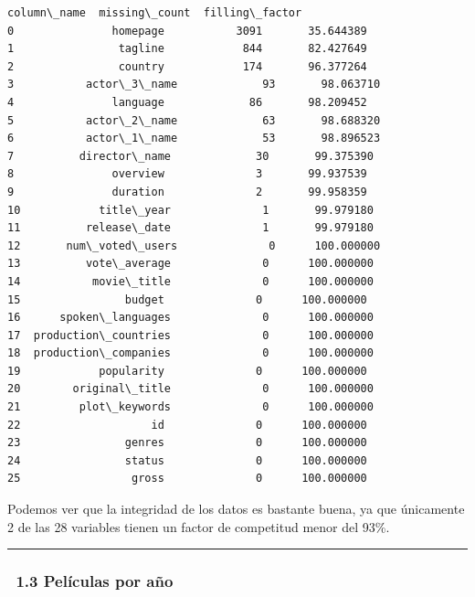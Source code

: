             \begin{tcolorbox}[breakable, boxrule=.5pt, size=fbox, pad at break*=1mm, opacityfill=0]
\begin{Verbatim}[commandchars=\\\{\}]
             column\_name  missing\_count  filling\_factor
0               homepage           3091       35.644389
1                tagline            844       82.427649
2                country            174       96.377264
3           actor\_3\_name             93       98.063710
4               language             86       98.209452
5           actor\_2\_name             63       98.688320
6           actor\_1\_name             53       98.896523
7          director\_name             30       99.375390
8               overview              3       99.937539
9               duration              2       99.958359
10            title\_year              1       99.979180
11          release\_date              1       99.979180
12       num\_voted\_users              0      100.000000
13          vote\_average              0      100.000000
14           movie\_title              0      100.000000
15                budget              0      100.000000
16      spoken\_languages              0      100.000000
17  production\_countries              0      100.000000
18  production\_companies              0      100.000000
19            popularity              0      100.000000
20        original\_title              0      100.000000
21         plot\_keywords              0      100.000000
22                    id              0      100.000000
23                genres              0      100.000000
24                status              0      100.000000
25                 gross              0      100.000000
\end{Verbatim}
\end{tcolorbox}
        
    Podemos ver que la integridad de los datos es bastante buena, ya que
únicamente 2 de las 28 variables tienen un factor de competitud menor
del 93\%.

    \begin{center}\rule{0.5\linewidth}{\linethickness}\end{center}

\subsubsection{~1.3 Películas por año}\label{peluxedculas-por-auxf1o}

